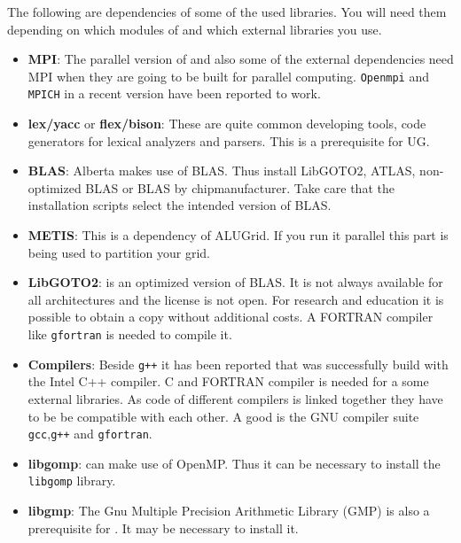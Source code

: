 The following are dependencies of some of the used libraries. You will need them depending on which modules of \Dune and which external libraries you use.
\begin{itemize}
\item \textbf{MPI}: The parallel version of \Dune and also some of the external dependencies need MPI when they are going to be built for parallel computing. \texttt{Openmpi} and \texttt{MPICH} in a recent version have been reported to work. 

\item \textbf{lex/yacc} or \textbf{flex/bison}: These are quite common developing tools, code generators for lexical analyzers and parsers. This is a prerequisite for UG.

\item \textbf{BLAS}: Alberta makes use of BLAS. Thus install LibGOTO2, ATLAS, non-optimized BLAS or BLAS by chipmanufacturer. Take care that the installation scripts select the intended version of BLAS. 

\item \textbf{METIS}: This is a dependency of ALUGrid. If you run it parallel this part is being used to partition your grid.

\item \textbf{LibGOTO2}: is an optimized version of BLAS. It is not always available for all architectures and 
the license is not open. For research and education it is possible to obtain a copy without additional costs.
A FORTRAN compiler like \texttt{gfortran} is needed to compile it.

\item \textbf{Compilers}: Beside \texttt{g++} it has been reported that \Dune was successfully build with the Intel C++ compiler. 
C and FORTRAN compiler is needed for a some external libraries. As code of different compilers is linked together they have to be be compatible with each other. A good is the GNU compiler suite \texttt{gcc},\texttt{g++} and \texttt{gfortran}.

\item \textbf{libgomp}: \Dune can make use of OpenMP. Thus it can be necessary to install the \texttt{libgomp} library.

\item \textbf{libgmp}: The Gnu Multiple Precision Arithmetic Library (GMP) is also a prerequisite for \Dune. It may be necessary to install it.
\end{itemize}

